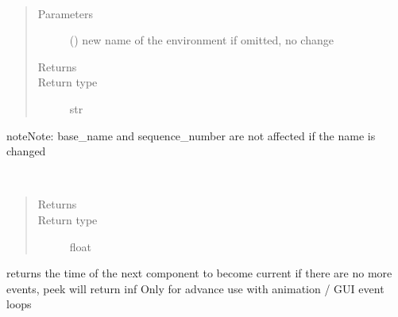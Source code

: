 \documentclass[letterpaper,10pt,english]{sphinxmanual}
\begin{document}
\begin{fulllineitems}
\begin{fulllineitems}
\end{fulllineitems}


\begin{fulllineitems}
\label{\detokenize{Reference:salabim.Environment.name}}~\begin{quote}\begin{description}
\item[{Parameters}] \leavevmode
{} () \textendash{} new name of the environment
if omitted, no change

\item[{Returns}] \leavevmode
{}

\item[{Return type}] \leavevmode
str

\end{description}\end{quote}

\begin{sphinxadmonition}{note}{Note:}
base\_name and sequence\_number are not affected if the name is changed
\end{sphinxadmonition}

\end{fulllineitems}


\begin{fulllineitems}
\label{\detokenize{Reference:salabim.Environment.now}}~\begin{quote}\begin{description}
\item[{Returns}] \leavevmode
{}

\item[{Return type}] \leavevmode
float

\end{description}\end{quote}

\end{fulllineitems}


\begin{fulllineitems}
\label{\detokenize{Reference:salabim.Environment.peek}}
returns the time of the next component to become current 
if there are no more events, peek will return inf 
Only for advance use with animation / GUI event loops


\end{fulllineitems}
\end{fulllineitems}
\end{document}
